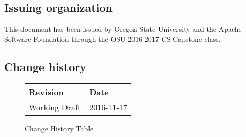 \subsection{Issuing organization}

This document has been issued by Oregon State University and the Apache Software Foundation through the OSU 2016-2017 CS Capstone class.

\subsection{Change history}
\begin{figure}
  \begin{tabular}{ | p{5cm} | p{5cm} |}
  \hline
    Revision & Date\\ \hline
    Working Draft & 2016-11-17 \\ \hline
  \end{tabular}
  \caption{Change History Table}
\end{figure}

